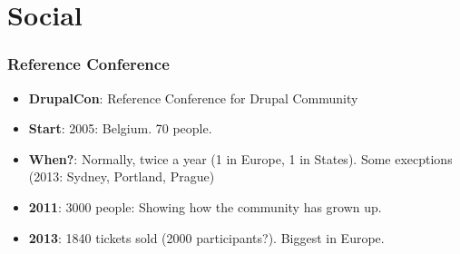 \section{Social}
% 
\begin{frame}[allowframebreaks]
\frametitle{Reference Conference}

\begin{itemize}
\item \textbf{DrupalCon}: Reference Conference for Drupal Community
\item \textbf{Start}: 2005: Belgium. 70 people.
\item \textbf{When?}: Normally, twice a year (1 in Europe, 1 in States). Some execptions (2013: Sydney, Portland, Prague)
\item \textbf{2011}: 3000 people: Showing how the community has grown up.
\item \textbf{2013}: 1840 tickets sold (2000 participants?). Biggest in Europe.
\end{itemize}

\end{frame}
